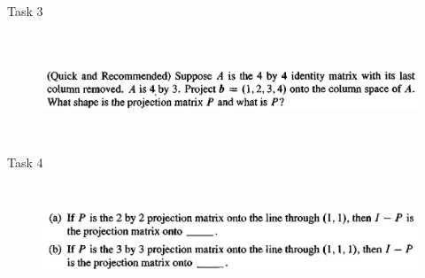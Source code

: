 \documentclass[aspectratio=169]{beamer}
\begin{document}
    \begin{frame}[t]{Task 3}
        \framesubtitle{}
        \begin{figure}[H]
            \centering\includegraphics[height=3cm,width=1\textwidth,keepaspectratio]{3.png}
            \label{fig:3.png}
        \end{figure}
    \end{frame}

    \begin{frame}[t]{Task 4}
        \framesubtitle{}
        \begin{figure}[H]
            \centering\includegraphics[height=3cm,width=1\textwidth,keepaspectratio]{4.png}
            \label{fig:4.png}
        \end{figure}
    \end{frame}
\end{document}
